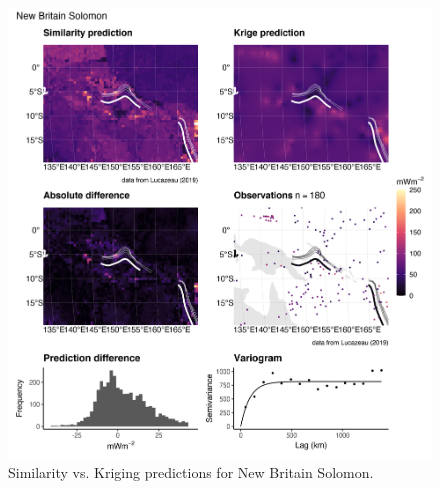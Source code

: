 \documentclass[draft,linenumbers]{agujournal2018}
\begin{document}
\begin{figure}[h]

{\centering \includegraphics[width=0.95\linewidth,]{../figs/diff/comp/New_Britain_Solomon} 

}

\caption{Similarity vs. Kriging predictions for New Britain Solomon.}\label{fig:new.britain.solomon.comp}
\end{figure}
\end{document}
